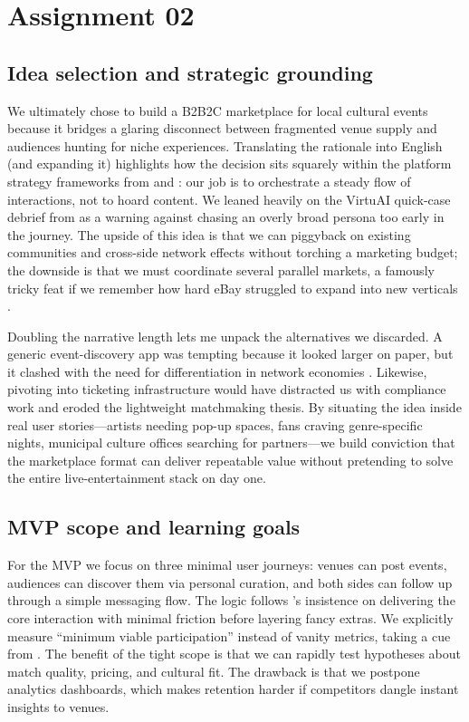 \section*{Assignment 02}

\subsection*{Idea selection and strategic grounding}
We ultimately chose to build a B2B2C marketplace for local cultural events because it bridges a glaring disconnect between fragmented venue supply and audiences hunting for niche experiences. Translating the rationale into English (and expanding it) highlights how the decision sits squarely within the platform strategy frameworks from \citet{Choudary2016} and \citet{Reillier2017}: our job is to orchestrate a steady flow of interactions, not to hoard content. We leaned heavily on the VirtuAI quick-case debrief from \citet{Gunasilan2024} as a warning against chasing an overly broad persona too early in the journey. The upside of this idea is that we can piggyback on existing communities and cross-side network effects without torching a marketing budget; the downside is that we must coordinate several parallel markets, a famously tricky feat if we remember how hard eBay struggled to expand into new verticals \citep{HagiuWright2013}.

Doubling the narrative length lets me unpack the alternatives we discarded. A generic event-discovery app was tempting because it looked larger on paper, but it clashed with the need for differentiation in network economies \citep{ShapiroVarian1999}. Likewise, pivoting into ticketing infrastructure would have distracted us with compliance work and eroded the lightweight matchmaking thesis. By situating the idea inside real user stories---artists needing pop-up spaces, fans craving genre-specific nights, municipal culture offices searching for partners---we build conviction that the marketplace format can deliver repeatable value without pretending to solve the entire live-entertainment stack on day one.

\subsection*{MVP scope and learning goals}
For the MVP we focus on three minimal user journeys: venues can post events, audiences can discover them via personal curation, and both sides can follow up through a simple messaging flow. The logic follows \citet{HagiuWright2013}'s insistence on delivering the core interaction with minimal friction before layering fancy extras. We explicitly measure ``minimum viable participation'' instead of vanity metrics, taking a cue from \citet{Reillier2017}. The benefit of the tight scope is that we can rapidly test hypotheses about match quality, pricing, and cultural fit. The drawback is that we postpone analytics dashboards, which makes retention harder if competitors dangle instant insights to venues.

